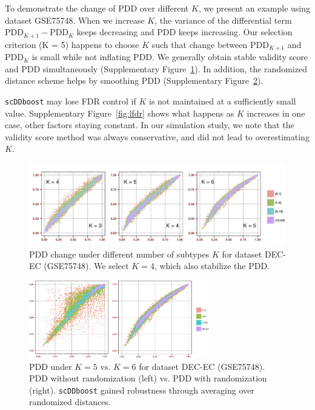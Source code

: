 \documentclass[aoas,preprint]{imsart}
\begin{document}
To demonstrate the change of PDD over different $K$, we present an example using dataset
GSE75748. When we increase $K$, the variance of the differential term $\text{PDD}_{K + 1} - \text{PDD}_K$ keeps decreasing and PDD keeps increasing. Our selection criterion (K = 5) happens to choose $K$ such that change between $\text{PDD}_{K + 1}$ and $\text{PDD}_K$ is small while not inflating PDD. We generally obtain stable validity score and PDD simultaneously (Supplementary Figure~\ref{fig:rwk}). In addition, the randomized distance 
scheme helps by smoothing PDD (Supplementary Figure~\ref{fig:s10}).

\texttt{scDDboost} may lose FDR control if $K$ is not maintained at
a sufficiently small value.  Supplementary Figure~\ref{fig:lfdr} shows what happens as $K$ increases
in one case, other factors staying constant.
In our simulation study, we note that the validity score method was always conservative, and did
not lead to overestimating $K$.

\begin{figure}[h]
\includegraphics[width = 1\textwidth]{Figs/Kchange.png}
\caption{PDD change under different number of subtypes $K$ for dataset DEC-EC (GSE75748). We select $K = 4$, which also stabilize the PDD.}
\label{fig:rwk}
\end{figure}

\begin{figure}[h]
\includegraphics[width = 0.7\textwidth]{Figs/rw.pdf}
\caption{PDD under $K = 5$ vs. $K = 6$ for dataset DEC-EC (GSE75748). PDD without randomization (left) vs. PDD with randomization (right). \texttt{scDDboost} gained robustness through averaging over 
randomized distances.}
\label{fig:s10}
\end{figure}
\end{document}
